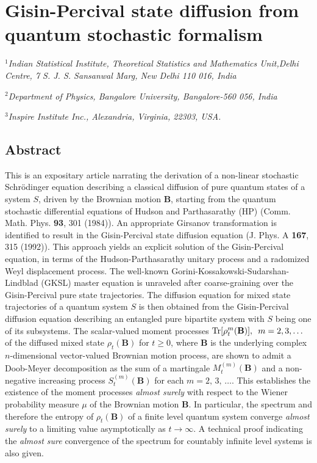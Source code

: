 \chapter[Gisin-Percival state diffusion from quantum stochastic formalism]{Gisin-Percival state diffusion from quantum stochastic formalism}  



${}^1$\textit{Indian Statistical Institute, Theoretical Statistics and Mathematics Unit,Delhi Centre, 7 S. J. S. Sansanwal Marg, New Delhi 110 016, India} 

${}^{2}$\textit{Department of Physics, Bangalore University, Bangalore-560 056, India}

${}^{3}$\textit{Inspire Institute Inc., Alexandria, Virginia, 22303, USA.}

\section*{Abstract}

This is an expositary article narrating  the derivation of a non-linear stochastic Schr{\"o}dinger equation describing a classical diffusion of pure quantum states of a system $S$,  driven by the Brownian motion $\mathbf{B}$, starting from the quantum stochastic differential equations of Hudson and Parthasarathy (HP) (Comm. Math. Phys. {\bf 93}, 301 (1984)). An appropriate Girsanov transformation is identified to result in the Gisin-Percival state diffusion equation (J. Phys. A {\bf 167}, 315 (1992)). This approach yields an explicit solution of the Gisin-Percival equation, in terms of the Hudson-Parthasarathy unitary process and a radomized Weyl displacement process. The well-known Gorini-Kossakowski-Sudarshan-Lindblad (GKSL) master equation is unraveled after coarse-graining over the Gisin-Percival pure state trajectories. The diffusion equation for  mixed state trajectories of a quantum system  $S$ is then obtained  from the Gisin-Percival diffusion equation describing an entangled pure bipartite system with $S$ being one of its subsystems. The scalar-valued moment processes  ${\rm Tr}[\rho_t^m( \mathbf{B})], \,\,\, m=2,3,\ldots$  of the diffused mixed state  $\rho_t(\mathbf{B})$ for  $t\geq 0$,  where $\mathbf{B}$ is the underlying  complex $n$-dimensional vector-valued Brownian motion process,   are shown to admit a Doob-Meyer decomposition as the sum of a martingale $M^{(m)}_t(\mathbf{B})$ and a non-negative increasing process $S^{(m)}_t(\mathbf{B})$ for each $m=2,\, 3,\, \ldots$. This establishes the existence of the  moment processes {\em almost surely} with respect to the Wiener probability measure $\mu$  of the Brownian motion $\mathbf{B}$. In particular, the spectrum and therefore the entropy of $\rho_t (\mathbf{B})$ of a finite level quantum system converge {\em almost surely} to a limiting value asymptotically as $t\rightarrow \infty$. A technical proof indicating the {\em almost sure} convergence of the spectrum for countably infinite level systems is also given.   

